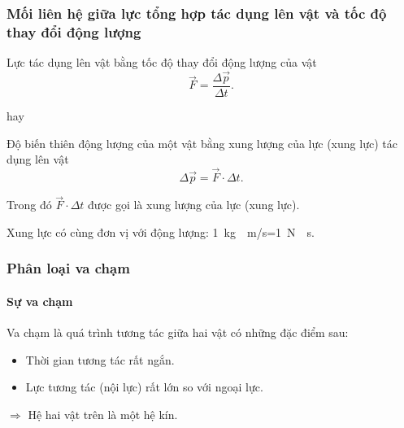 \begin{tomtat}
	\subsubsection{Mối liên hệ giữa lực tổng hợp tác dụng lên vật và tốc độ thay đổi động lượng}
	\begin{boxdn}
		Lực tác dụng lên vật bằng tốc độ thay đổi động lượng của vật
		$$\vec{F}=\dfrac{\Delta\vec{p}}{\Delta t}.$$
	\end{boxdn}
	hay
	\begin{boxdn}
	Độ biến thiên động lượng của một vật bằng xung lượng của lực (xung lực) tác dụng lên vật
		$$\Delta\vec{p}=\vec{F}\cdot\Delta t.$$
	\end{boxdn}
	Trong đó $\vec{F}\cdot\Delta t$ được gọi là xung lượng của lực (xung lực).
	\begin{note} Xung lực có cùng đơn vị với động lượng:
		\SI{1}{\kilogram\cdot\meter/\second}=\SI{1}{\newton\cdot\second}.
	\end{note}
	\subsubsection{Phân loại va chạm}
	\paragraph{Sự va chạm}
	\begin{dn}
		Va chạm là quá trình tương tác giữa hai vật có những đặc điểm sau:
		\begin{itemize}
			\item Thời gian tương tác rất ngắn.
			\item Lực tương tác (nội lực) rất lớn so với ngoại lực.
		\end{itemize}
		$\Rightarrow$ Hệ hai vật trên là một hệ kín.
	\end{dn}

\end{tomtat}
